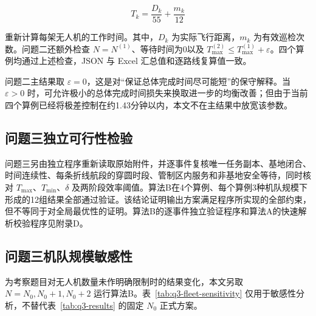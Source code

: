 \documentclass[UTF8,a4paper,12pt]{ctexart}
\numberwithin{equation}{section}
\numberwithin{equation}{section}
\begin{document}
\[
  T_k=\frac{D_k}{55}+\frac{m_k}{12}
\]

重新计算每架无人机的工作时间。其中，\(D_k\) 为实际飞行距离，\(m_k\) 为有效巡检次数。问题二还额外检查 \(N=N^{(1)}\)、等待时间为0以及 \(T_{\max}^{(2)}\leq T_{\max}^{(1)}+\varepsilon\)。四个算例均通过上述检查，JSON 与 Excel 汇总值和逐路线复算值一致。

问题二主结果取 \(\varepsilon=0\)，这是对“保证总体完成时间尽可能短”的保守解释。当 \(\varepsilon>0\) 时，可允许极小的总体完成时间损失来换取进一步的均衡改善；但由于当前四个算例已经将极差控制在约1.43分钟以内，本文不在主结果中放宽该参数。

\subsection{问题三独立可行性检验}

问题三另由独立程序重新读取原始附件，并逐事件复核唯一任务副本、基地闭合、时间连续性、每条折线航段的穿圆时段、管制区内服务和非基地安全等待，同时核对 $T_{\max}$、$T_{\min}$、$\delta$ 及两阶段效率阈值。算法B在4个算例、每个算例3种机队规模下形成的12组结果全部通过验证。该结论证明输出方案满足程序所实现的全部约束，但不等同于对全局最优性的证明。算法B的逐事件独立验证程序和算法A的快速解析校验程序见附录D。


\subsection{问题三机队规模敏感性}

为考察题目对无人机数量未作明确限制时的结果变化，本文另取 $N=N_0,N_0+1,N_0+2$ 运行算法B。表~\ref{tab:q3-fleet-sensitivity} 仅用于敏感性分析，不替代表~\ref{tab:q3-results} 的固定 $N_0$ 正式方案。
\end{document}
